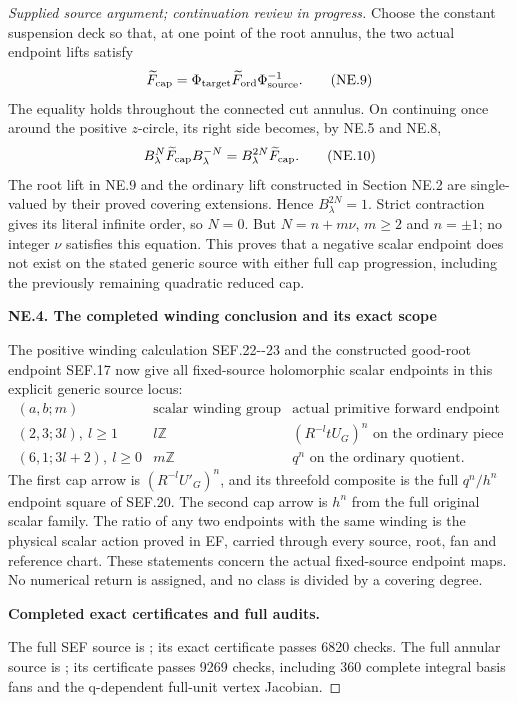 \begin{proof}[Supplied source argument; continuation review in progress]
Choose the constant suspension deck so that, at one point of the
root annulus, the two actual endpoint lifts satisfy
\[
 \widetilde F_{\rm cap}
     =\Phi_{\rm target}\widetilde F_{\rm ord}
                         \Phi_{\rm source}^{-1}.
 \tag{NE.9}
\]
The equality holds throughout the connected cut annulus. On
continuing once around the positive \(z\)-circle, its right side
becomes, by NE.5 and NE.8,
\[
 B_\lambda^N\widetilde F_{\rm cap}B_\lambda^{-N}
                  =B_\lambda^{2N}\widetilde F_{\rm cap}.
 \tag{NE.10}
\]
The root lift in NE.9 and the ordinary lift constructed in
Section NE.2 are single-valued by their proved covering extensions. Hence
\(B_\lambda^{2N}=1\). Strict contraction gives its literal infinite
order, so \(N=0\). But \(N=n+m\nu\), \(m\ge2\) and
\(n=\pm1\); no integer \(\nu\) satisfies this equation.
This proves that a negative scalar endpoint does not exist on
the stated generic source with either full cap progression,
including the previously remaining quadratic reduced cap.

\par

\medskip\noindent\textbf{NE.4. The completed winding conclusion and its exact scope}

\par\nobreak

The positive winding calculation SEF.22-\/-23 and the constructed
good-root endpoint SEF.17 now give all fixed-source holomorphic
scalar endpoints in this explicit generic source locus:
\[
 \begin{array}{c|c|c}
 (a,b;m)&\text{scalar winding group}&\text{actual primitive forward endpoint}\\
 (2,3;3l),\ l\ge1&l\mathbb Z&(R^{-l}tU_G)^n\text{ on the ordinary piece}\\
 (6,1;3l+2),\ l\ge0&m\mathbb Z&q^n\text{ on the ordinary quotient}.
 \end{array}
 \tag{NE.11}
\]
The first cap arrow is \((R^{-l}U'_G)^n\), and its threefold
composite is the full \(q^n/h^n\) endpoint square of SEF.20.
The second cap arrow is \(h^n\) from the full original scalar
family. The ratio of any two endpoints with the same winding is
the physical scalar action proved in EF, carried through every
source, root, fan and reference chart. These statements concern
the actual fixed-source endpoint maps. No numerical return is
assigned, and no class is divided by a covering degree.


\par\medskip\noindent\textbf{Completed exact certificates and full audits.}\par
The full SEF source is
;
its exact certificate passes 6820 checks. The full annular source is
;
its certificate passes 9269 checks, including 360 complete integral
basis fans and the q-dependent full-unit vertex Jacobian.


\end{proof}
